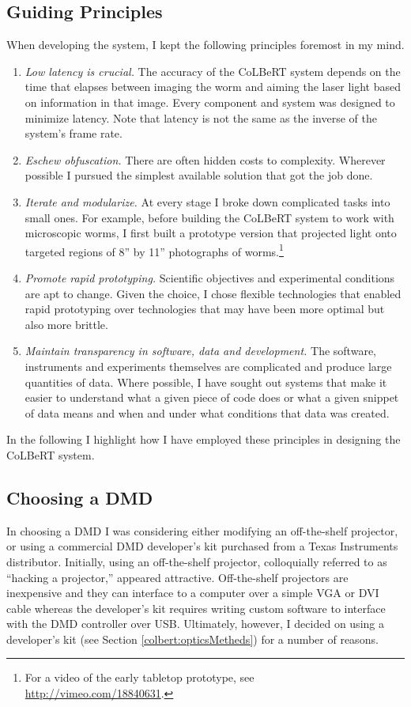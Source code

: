 \subsection{Guiding Principles} 
When developing the system, I kept the following principles foremost in my mind.
\begin{enumerate}
	\item \emph{Low latency is crucial.} The accuracy of the CoLBeRT system depends on the time that elapses between imaging the worm and aiming the laser light based on information in that image. Every component and system was designed to minimize latency.  Note that latency is not the same as the inverse of the system's frame rate. 
	\item \emph{Eschew obfuscation.} There are often hidden costs to complexity. Wherever possible I pursued the simplest available solution that got the job done.  
	\item \emph{Iterate and modularize.}  At every stage I broke down complicated tasks into small ones.  For example, before building the CoLBeRT system to work with microscopic worms, I first built a prototype version that projected light onto targeted regions of 8\textonehalf'' by 11'' photographs of worms.\footnote{For a video of the early tabletop prototype, see \url{http://vimeo.com/18840631}.}  
	\item \emph{Promote rapid prototyping.} Scientific objectives and experimental conditions are apt to change. Given the choice, I chose flexible technologies that enabled rapid prototyping over technologies that may have been more optimal but also more brittle.
	\item \emph{Maintain transparency in software, data and development.} The software, instruments and  experiments themselves are complicated and produce large quantities of data. Where possible, I have sought out systems that make it easier to understand what a given piece of code  does or what a given snippet of data means and when and under what conditions that data was created. 
\end{enumerate}
In the following  I highlight how I have employed these principles in designing the CoLBeRT system.

\subsection{Choosing a DMD} 
In choosing a DMD I was considering either modifying an off-the-shelf projector, or using a commercial DMD developer's kit purchased from a Texas Instruments distributor. Initially, using an off-the-shelf projector, colloquially referred to as ``hacking a projector,'' appeared attractive. Off-the-shelf projectors are inexpensive and they can interface to a computer over a simple VGA or DVI cable whereas the developer's kit requires writing custom software to interface with the DMD controller over USB. 
Ultimately, however, I decided on using a developer's kit (see Section \ref{colbert:opticsMetheds}) for a number of reasons. 

